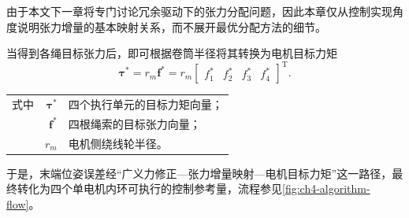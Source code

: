 由于本文下一章将专门讨论冗余驱动下的张力分配问题，因此本章仅从控制实现角度说明张力增量的基本映射关系，而不展开最优分配方法的细节。

当得到各绳目标张力后，即可根据卷筒半径将其转换为电机目标力矩
\begin{equation}
  \bm \tau^\ast = r_m \bm f^\ast = r_m \begin{bmatrix} f_1^\ast & f_2^\ast & f_3^\ast & f_4^\ast \end{bmatrix}^{\mathrm T}. \label{eq:ch4-tau-star}
\end{equation}
\begin{tabularx}{\textwidth}{@{}l@{\quad}r@{———}X@{}}
  式中 & $\bm \tau^\ast$ & 四个执行单元的目标力矩向量；\\
       & $\bm f^\ast$ & 四根绳索的目标张力向量；\\
       & $r_m$ & 电机侧绕线轮半径。
\end{tabularx}
于是，末端位姿误差经“广义力修正—张力增量映射—电机目标力矩”这一路径，最终转化为四个单电机内环可执行的控制参考量，流程参见\cref{fig:ch4-algorithm-flow}。

